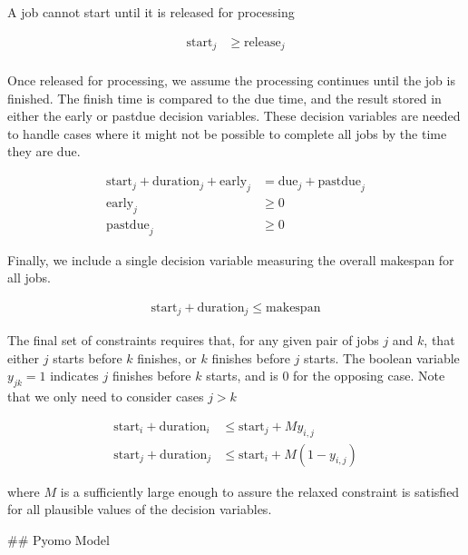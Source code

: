 \documentclass[11pt]{article}
\begin{document}
A job cannot start until it is released for processing

\begin{align*}
\text{start}_{j} & \geq \text{release}_{j}\\
\end{align*}

Once released for processing, we assume the processing continues until
the job is finished. The finish time is compared to the due time, and
the result stored in either the early or pastdue decision variables.
These decision variables are needed to handle cases where it might not
be possible to complete all jobs by the time they are due.

\begin{align*}
\text{start}_{j} + \text{duration}_{j} + \text{early}_{j} & = \text{due}_{j} + \text{pastdue}_{j}\\
\text{early}_{j} & \geq 0 \\
\text{pastdue}_{j} & \geq 0
\end{align*}

Finally, we include a single decision variable measuring the overall
makespan for all jobs.

\begin{align*}
\text{start}_{j} +\text{duration}_{j} \leq \text{makespan}
\end{align*}

The final set of constraints requires that, for any given pair of jobs
\(j\) and \(k\), that either \(j\) starts before \(k\) finishes, or
\(k\) finishes before \(j\) starts. The boolean variable \(y_{jk} = 1\)
indicates \(j\) finishes before \(k\) starts, and is 0 for the opposing
case. Note that we only need to consider cases \(j > k\)

\begin{align*}
\text{start}_{i}+\text{duration}_{i} & \leq \text{start}_{j}+My_{i,j}\\
\text{start}_{j}+\text{duration}_{j} & \leq \text{start}_{i}+M(1-y_{i,j})
\end{align*}

where \(M\) is a sufficiently large enough to assure the relaxed
constraint is satisfied for all plausible values of the decision
variables.

     \#\# Pyomo Model
\end{document}
